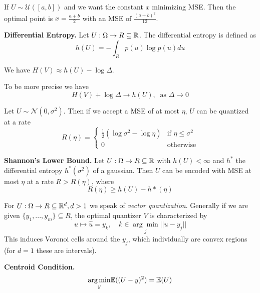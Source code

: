 If \(U \sim \mathcal{U}([a, b])\) and we want the constant \(x\) minimizing MSE. Then the optimal point is 
\(x = \frac{a+b}{2}\) with an MSE of \(\frac{(a+b)^2}{12}\).

\textbf{Differential Entropy.} Let \(U: \Omega \to R \subseteq \mathbb{R}\). The differential entropy is defined as
\[h(U) = - \int_{R}p(u) \log p(u) du\]

We have \(H(V) \approx h(U) - \log \Delta\).

To be more precise we have 
\[H(V) + \log \Delta \to h(U), \ \text{ as } \Delta \to 0\]

Let \(U \sim \mathcal{N}(0, \sigma^2)\). Then if we accept a MSE of at most \(\eta\), \(U\) can 
be quantized at a rate \[R(\eta) = \begin{cases}
    \frac{1}{2}(\log \sigma^2 - \log \eta) & \text{if } \eta \leq \sigma^2\\
    0 & \text{otherwise}
\end{cases}\]

\textbf{Shannon's Lower Bound.} Let \(U: \Omega \to R\subseteq \mathbb{R}\) with \(h(U) < \infty\) 
and \(h^*\) the differential entropy \(h^*(\sigma^2)\) of a gaussian. Then \(U\) can be encoded with 
MSE at most \(\eta\) at a rate \(R > R(\eta)\), where 
\[R(\eta) \geq h(U) - h*(\eta)\]

For \(U: \Omega \to R \subseteq \mathbb{R}^d, d>1\) we speak of \textit{vector quantization}. 
Generally if we are given \(\{y_1, ..., y_m\} \subseteq R\), the optimal quantizer \(V\) is characterized by 
\[u \mapsto \hat{u} = y_k, \quad k \in \underset{j}{\arg \min} ||u - y_j||\]
This induces Voronoi cells around the \(y_j\), which individually are convex regions (for \(d = 1\) these are intervals).

\textbf{Centroid Condition.} \[\underset{y}{\arg \min}\mathbb{E}((U - y)^2) = \mathbb{E}(U)\]
